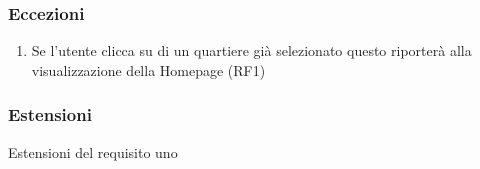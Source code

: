         \subsubsection{Eccezioni}
            \begin{enumerate}
                \item Se l'utente clicca su di un quartiere già selezionato questo riporterà alla visualizzazione della Homepage (RF1)
            \end{enumerate}
        \subsubsection{Estensioni}
            Estensioni del requisito uno    %